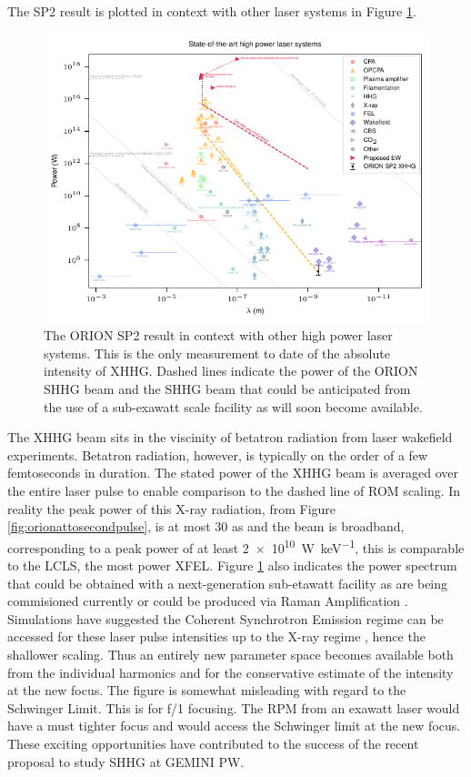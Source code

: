 The SP2 result is plotted in context with other laser systems in Figure \ref{fig:lasersystems}.
\begin{figure}
	\centering
	\includegraphics{figures/intro/laser_systems}
	\caption[The ORION result in context.]{The ORION SP2 result in context with other high power laser systems. This is the only measurement to date of the absolute intensity of XHHG. Dashed lines indicate the power of the ORION SHHG beam and the SHHG beam that could be anticipated from the use of a sub-exawatt scale facility as will soon become available.}
	\label{fig:lasersystems}
\end{figure}
The XHHG beam sits in the viscinity of betatron radiation from laser wakefield experiments. Betatron radiation, however, is typically on the order of a few femtoseconds in duration. The stated power of the XHHG beam is averaged over the entire laser pulse to enable comparison to the dashed line of ROM scaling. In reality the peak power of this X-ray radiation, from Figure \ref{fig:orionattosecondpulse}, is at most 30 as and the beam is broadband, corresponding to a peak power of at least \qty{2e10}{W.keV^{-1}}, this is comparable to the LCLS, the most power XFEL.
Figure \ref{fig:lasersystems} also indicates the power spectrum that could be obtained with a next-generation sub-etawatt facility as are being commisioned currently or could be produced via Raman Amplification \cite{trinesSimulationsEfficientRaman2011}. Simulations have suggested the Coherent Synchrotron Emission regime can be accessed for these laser pulse intensities up to the X-ray regime \cite{edwardsXRayEmissionEffectiveness2020}, hence the shallower scaling. Thus an entirely new parameter space becomes available both from the individual harmonics and for the conservative estimate of the intensity at the new focus. The figure is somewhat misleading with regard to the Schwinger Limit. This is for f/1 focusing. The RPM from an exawatt laser would have a must tighter focus and would access the Schwinger limit at the new focus. These exciting opportunities have contributed to the success of the recent proposal to study SHHG at GEMINI PW.

